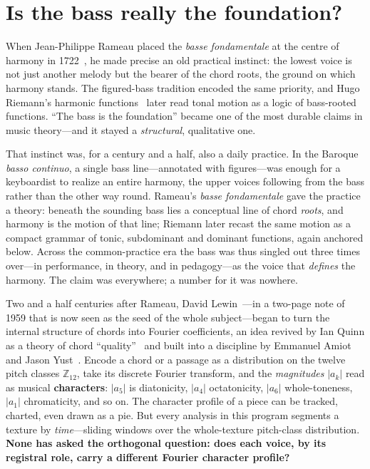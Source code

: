\documentclass[11pt]{article}
\newcommand{\Ztwelve}{\mathbb{Z}_{12}}
\begin{document}
\section{Is the bass really the foundation?}\label{sec:hook}

When Jean-Philippe Rameau placed the \emph{basse fondamentale} at the centre of harmony in
1722~\cite{Rameau}, he made precise an old practical instinct: the lowest voice is not just another melody
but the bearer of the chord roots, the ground on which harmony stands. The figured-bass tradition encoded
the same priority, and Hugo Riemann's harmonic functions~\cite{Riemann} later read tonal motion as a logic
of bass-rooted functions. ``The bass is the foundation'' became one of the most durable claims in music
theory---and it stayed a \emph{structural}, qualitative one.

That instinct was, for a century and a half, also a daily practice. In the Baroque \emph{basso continuo}, a
single bass line---annotated with figures---was enough for a keyboardist to realize an entire harmony, the
upper voices following from the bass rather than the other way round. Rameau's \emph{basse fondamentale}
gave the practice a theory: beneath the sounding bass lies a conceptual line of chord \emph{roots}, and
harmony is the motion of that line; Riemann later recast the same motion as a compact grammar of tonic,
subdominant and dominant functions, again anchored below. Across the common-practice era the bass was thus
singled out three times over---in performance, in theory, and in pedagogy---as the voice that
\emph{defines} the harmony. The claim was everywhere; a number for it was nowhere.

Two and a half centuries after Rameau, David Lewin~\cite{Lewin1959}---in a two-page note of 1959 that is
now seen as the seed of the whole subject---began to turn the internal structure of chords into Fourier
coefficients, an idea revived by Ian Quinn as a theory of chord ``quality''~\cite{Quinn} and built into a
discipline by Emmanuel Amiot~\cite{Amiot} and Jason Yust~\cite{Yust2017,Yust2019}. Encode a chord or a passage as a distribution
on the twelve pitch classes $\Ztwelve$, take its discrete Fourier transform, and the \emph{magnitudes}
$|a_k|$ read as musical \textbf{characters}: $|a_5|$ is diatonicity, $|a_4|$ octatonicity, $|a_6|$
whole-toneness, $|a_1|$ chromaticity, and so on. The character profile of a piece can be tracked, charted,
even drawn as a pie. But every analysis in this program segments a texture by \emph{time}---sliding windows
over the whole-texture pitch-class distribution. \textbf{None has asked the orthogonal question: does each
voice, by its registral role, carry a different Fourier character profile?}
\end{document}
